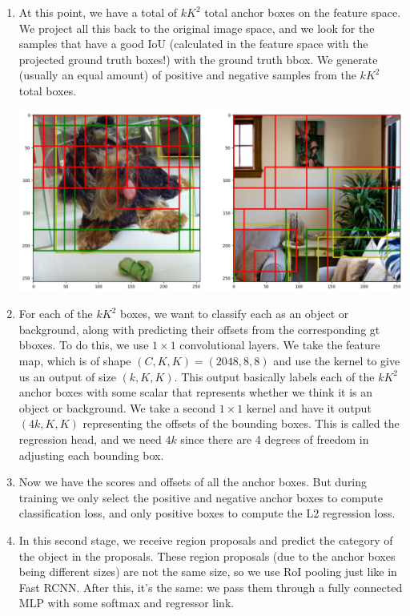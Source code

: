\documentclass{article}
\theoremstyle{definition}
\theoremstyle{remark}
\theoremstyle{definition}
\begin{document}
\begin{enumerate}
          \item At this point, we have a total of $k K^2$ total anchor boxes on the feature space. We project all this back to the original image space, and we look for the samples that have a good IoU (calculated in the feature space with the projected ground truth boxes!) with the ground truth bbox. We generate (usually an equal amount) of positive and negative samples from the $k K^2$ total boxes. 
          \begin{center}
              \includegraphics[scale=0.2]{img/gt_sampling.png}
          \end{center}
          
          \item For each of the $k K^2$ boxes, we want to classify each as an object or background, along with predicting their offsets from the corresponding gt bboxes. To do this, we use $1 \times 1$ convolutional layers. We take the feature map, which is of shape $(C, K, K) = (2048, 8, 8)$ and use the kernel to give us an output of size $(k, K, K)$. This output basically labels each of the $k K^2$ anchor boxes with some scalar that represents whether we think it is an object or background. We take a second $1 \times 1$ kernel and have it output $(4k, K, K)$ representing the offsets of the bounding boxes. This is called the regression head, and we need $4k$ since there are 4 degrees of freedom in adjusting each bounding box. 
          
          \item Now we have the scores and offsets of all the anchor boxes. But during training we only select the positive and negative anchor boxes to compute classification loss, and only positive boxes to compute the L2 regression loss. 

          \item In this second stage, we receive region proposals and predict the category of the object in the proposals. These region proposals (due to the anchor boxes being different sizes) are not the same size, so we use RoI pooling just like in Fast RCNN. After this, it's the same: we pass them through a fully connected MLP with some softmax and regressor link. 


\end{enumerate}
\end{document}
